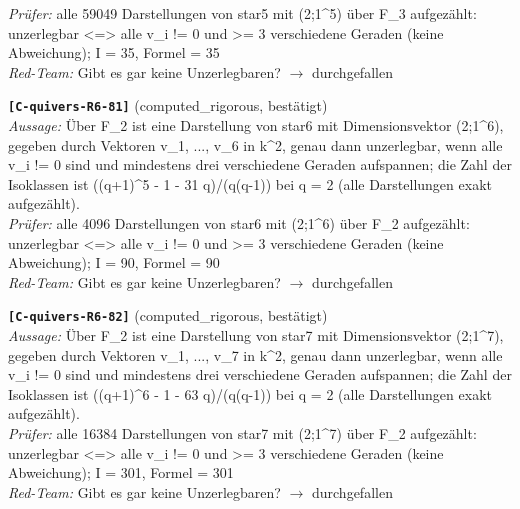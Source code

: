 \documentclass[11pt]{article}
\theoremstyle{definition}\newtheorem{definition}[theorem]{Definition}\newtheorem{remark}[theorem]{Remark}\newtheorem{observation}[theorem]{Numerical observation}
\begin{document}
\textit{Prüfer:} alle 59049 Darstellungen von star5 mit (2;1\textasciicircum{}5) über F\_3 aufgezählt: unzerlegbar <=> alle v\_i != 0 und >= 3 verschiedene Geraden (keine Abweichung); I = 35, Formel = 35\\
\textit{Red-Team:} Gibt es gar keine Unzerlegbaren? $\to$ durchgefallen\par\medskip
\noindent\textbf{\texttt{[C-quivers-R6-81]}} (computed\_rigorous, bestätigt)\\
\textit{Aussage:} Über F\_2 ist eine Darstellung von star6 mit Dimensionsvektor (2;1\textasciicircum{}6), gegeben durch Vektoren v\_1, ..., v\_6 in k\textasciicircum{}2, genau dann unzerlegbar, wenn alle v\_i != 0 sind und mindestens drei verschiedene Geraden aufspannen; die Zahl der Isoklassen ist ((q+1)\textasciicircum{}5 - 1 - 31 q)/(q(q-1)) bei q = 2 (alle Darstellungen exakt aufgezählt).\\
\textit{Prüfer:} alle 4096 Darstellungen von star6 mit (2;1\textasciicircum{}6) über F\_2 aufgezählt: unzerlegbar <=> alle v\_i != 0 und >= 3 verschiedene Geraden (keine Abweichung); I = 90, Formel = 90\\
\textit{Red-Team:} Gibt es gar keine Unzerlegbaren? $\to$ durchgefallen\par\medskip
\noindent\textbf{\texttt{[C-quivers-R6-82]}} (computed\_rigorous, bestätigt)\\
\textit{Aussage:} Über F\_2 ist eine Darstellung von star7 mit Dimensionsvektor (2;1\textasciicircum{}7), gegeben durch Vektoren v\_1, ..., v\_7 in k\textasciicircum{}2, genau dann unzerlegbar, wenn alle v\_i != 0 sind und mindestens drei verschiedene Geraden aufspannen; die Zahl der Isoklassen ist ((q+1)\textasciicircum{}6 - 1 - 63 q)/(q(q-1)) bei q = 2 (alle Darstellungen exakt aufgezählt).\\
\textit{Prüfer:} alle 16384 Darstellungen von star7 mit (2;1\textasciicircum{}7) über F\_2 aufgezählt: unzerlegbar <=> alle v\_i != 0 und >= 3 verschiedene Geraden (keine Abweichung); I = 301, Formel = 301\\
\textit{Red-Team:} Gibt es gar keine Unzerlegbaren? $\to$ durchgefallen\par\medskip
\end{document}
